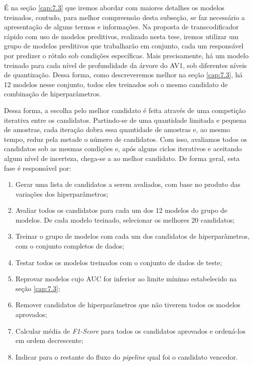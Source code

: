 É na seção \ref{cap:7.3} que iremos abordar com maiores detalhes os modelos treinados, contudo, para melhor compreensão desta subseção, se faz necessário a apresentação de alguns termos e informações. Na proposta de transcodificador rápido com uso de modelos preditivos, realizado nesta tese, iremos utilizar um grupo de modelos preditivos que trabalharão em conjunto, cada um responsável por predizer o rótulo sob condições específicas. Mais precisamente, há um modelo treinado para cada nível de profundidade da árvore do AV1, sob diferentes níveis de quantização. Dessa forma, como descreveremos melhor na seção \ref{cap:7.3}, há 12 modelos nesse conjunto, todos eles treinados sob o mesmo candidato de combinação de hiperparâmetros.

Dessa forma, a escolha pelo melhor candidato é feita através de uma competição iterativa entre os candidatos. Partindo-se de uma quantidade limitada e pequena de amostras, cada iteração dobra essa quantidade de amostras e, ao mesmo tempo, reduz pela metade o número de candidatos. Com isso, avaliamos todos os candidatos sob as mesmas condições e, após alguns ciclos iterativos e aceitando algum nível de incerteza, chega-se a ao melhor candidato. De forma geral, esta fase é responsável por:

\begin{enumerate}[1.]
    \item Gerar uma lista de candidatos a serem avaliados, com base no produto das variações dos hiperparâmetros;

    \item Avaliar todos os candidatos para cada um dos 12 modelos do grupo de modelos. De cada modelo treinado, selecionar os melhores 20 candidatos;

    \item Treinar o grupo de modelos com cada um dos candidatos de hiperparâmetros, com o conjunto completos de dados;

    \item Testar todos os modelos treinados com o conjunto de dados de teste;

    \item Reprovar modelos cujo AUC for inferior ao limite mínimo estabelecido na seção \ref{cap:7.3};

    \item Remover candidatos de hiperparâmetros que não tiverem todos os modelos aprovados;

    \item Calcular média de \textit{F1-Score} para todos os candidatos aprovados e ordená-los em ordem decrescente;

    \item Indicar para o restante do fluxo do \textit{pipeline} qual foi o candidato vencedor.
\end{enumerate}

